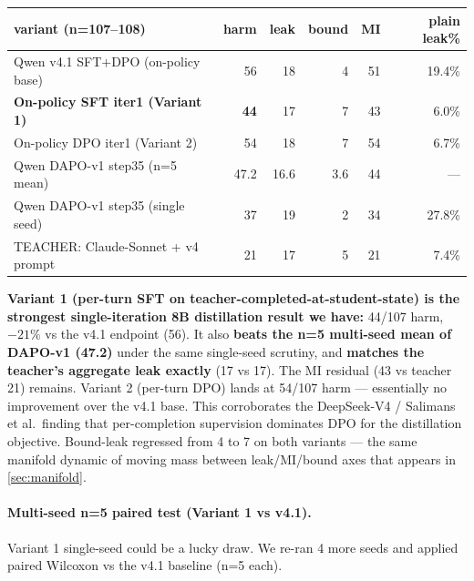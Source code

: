 \documentclass[11pt]{article}
\begin{document}
\begin{center}\small
\begin{tabular}{l r r r r r}
\toprule
variant (n=107--108)                                  & harm  & leak & bound & MI & plain leak\% \\
\midrule
Qwen v4.1 SFT$+$DPO (on-policy base)                  & 56    & 18   & 4     & 51 & 19.4\% \\
\textbf{On-policy SFT iter1 (Variant 1)}              & \textbf{44}    & 17   & 7     & 43 & 6.0\% \\
On-policy DPO iter1 (Variant 2)                       & 54    & 18   & 7     & 54 & 6.7\% \\
\midrule
Qwen DAPO-v1 step35 (n=5 mean)                        & 47.2  & 16.6 & 3.6   & 44 & --- \\
Qwen DAPO-v1 step35 (single seed)                     & 37    & 19   & 2     & 34 & 27.8\% \\
TEACHER: Claude-Sonnet + v4 prompt                    & 21    & 17   & 5     & 21 & 7.4\% \\
\bottomrule
\end{tabular}
\end{center}

\textbf{Variant 1 (per-turn SFT on teacher-completed-at-student-state) is the strongest single-iteration 8B distillation result we have:} 44/107 harm, $-21\%$ vs the v4.1 endpoint (56). It also \textbf{beats the n=5 multi-seed mean of DAPO-v1 (47.2)} under the same single-seed scrutiny, and \textbf{matches the teacher's aggregate leak exactly} (17 vs 17). The MI residual (43 vs teacher 21) remains. Variant 2 (per-turn DPO) lands at 54/107 harm --- essentially no improvement over the v4.1 base. This corroborates the DeepSeek-V4 / Salimans et al.\ finding that per-completion supervision dominates DPO for the distillation objective. Bound-leak regressed from 4 to 7 on both variants --- the same manifold dynamic of moving mass between leak/MI/bound axes that appears in \cref{sec:manifold}.

\paragraph{Multi-seed n=5 paired test (Variant 1 vs v4.1).} Variant 1 single-seed could be a lucky draw. We re-ran 4 more seeds and applied paired Wilcoxon vs the v4.1 baseline (n=5 each).
\end{document}
